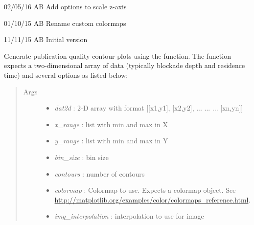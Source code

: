\documentclass[letterpaper,10pt,english]{sphinxmanual}
\begin{document}
\begin{DUlineblock}{0em}
\item[] 02/05/16                AB      Add options to scale z-axis
\item[] 01/10/15                AB  Rename custom colormaps
\item[] 11/11/15                AB      Initial version
\end{DUlineblock}

\begin{fulllineitems}
\label{api-doc/mosaicscripts:mosaicscripts.plots.contour.contour_plot}
Generate publication quality contour plots using the  function. The function expects a two-dimensional array of data (typically blockade depth and residence time) and several options as listed below:
\begin{quote}\begin{description}
\item[{Args}] \leavevmode\begin{itemize}
\item {} 
\emph{dat2d} :                         2-D array with format {[}{[}x1,y1{]}, {[}x2,y2{]}, ... ... ... {[}xn,yn{]}{]}

\item {} 
\emph{x\_range} :                           list with min and max in X

\item {} 
\emph{y\_range} :                           list with min and max in Y

\item {} 
\emph{bin\_size} :                          bin size

\item {} 
\emph{contours} :                          number of contours

\item {} 
\emph{colormap} :                          Colormap to use. Expects a colormap object. See \href{http://matplotlib.org/examples/color/colormaps\_reference.html}{http://matplotlib.org/examples/color/colormaps\_reference.html}.

\item {} 
\emph{img\_interpolation} :         interpolation to use for image


\end{itemize}
\end{description}
\end{quote}
\end{fulllineitems}
\end{document}
